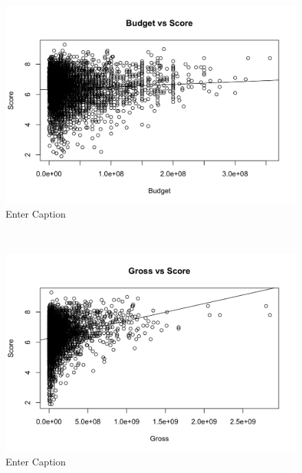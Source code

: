 \documentclass[12pt, letterpaper]{article}
\begin{document}
\\
\begin{figure}
    \centering
    \includegraphics[width=1\linewidth]{PS6b_Seong.png}
    \caption{Enter Caption}
    \label{fig:enter-label}
\end{figure}
\\
\begin{figure}
    \centering
    \includegraphics[width=1\linewidth]{PS6c_Seong.png}
    \caption{Enter Caption}
    \label{fig:enter-label}
\end{figure}
\end{document}
